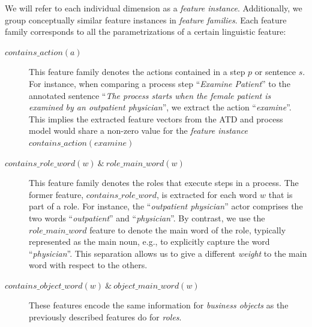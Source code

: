 We will refer to each individual dimension as a \emph{feature instance}.
Additionally, we group conceptually similar feature instances in \emph{feature
  families}. Each feature family corresponds to all the parametrizations of a
certain linguistic feature:

\begin{description}
	    \item[$contains\_action(a)$]{This feature family denotes the actions
          contained in a step $p$ or sentence $s$. For instance, when comparing
          a process step ``\textit{Examine Patient}'' to the annotated sentence
          ``\textit{The process starts when the female patient is examined by an
            outpatient physician}'', we extract the action ``\textit{examine}''.
          This implies the extracted feature vectors from the ATD and process
          model would share a non-zero value for the \emph{feature instance}
          $contains\_action(examine)$}

        \item[$contains\_role\_word(w) ~\&~ role\_main\_word(w)$]{This feature
            family denotes the roles that execute steps in a process. The
            former feature, $contains\_role\_word$, is extracted for each word
            $w$ that is part of a role. For instance, the ``\textit{outpatient
            physician}'' actor comprises the two words ``\textit{outpatient}'' and
            ``\textit{physician}''. By contrast, we use the $role\_main\_word$
            feature to denote the main word of the role, typically represented
            as the main noun, e.g., to explicitly capture the word
            ``\textit{physician}''. This separation allows us to give a different
            \emph{weight} to the main word with respect to the others.}

       \item[$contains\_object\_word(w) ~\&~ object\_main\_word(w)$]{These
           features encode the same information for \textit{business objects} as
           the previously described features do for \textit{roles}.}


\end{description}
